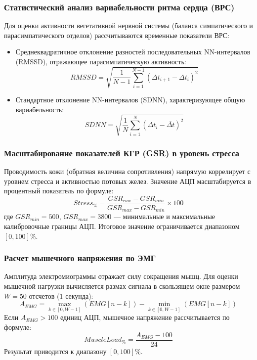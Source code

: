 \documentclass[utf8, russian]{eskdtext}
\begin{document}
\subsubsection{Статистический анализ вариабельности ритма сердца (ВРС)}
Для оценки активности вегетативной нервной системы (баланса симпатического и парасимпатического отделов) рассчитываются временные показатели ВРС:
\begin{itemize}
    \item Среднеквадратичное отклонение разностей последовательных NN-интервалов (RMSSD), отражающее парасимпатическую активность:
          \begin{equation}
              RMSSD = \sqrt{\frac{1}{N-1}\sum_{i=1}^{N-1} (\Delta t_{i+1} - \Delta t_i)^2}
          \end{equation}
    \item Стандартное отклонение NN-интервалов (SDNN), характеризующее общую вариабельность:
          \begin{equation}
              SDNN = \sqrt{\frac{1}{N}\sum_{i=1}^N (\Delta t_i - \overline{\Delta t})^2}
          \end{equation}
\end{itemize}

\subsubsection{Масштабирование показателей КГР (GSR) в уровень стресса}
Проводимость кожи (обратная величина сопротивления) напрямую коррелирует с уровнем стресса и активностью потовых желез. Значение АЦП масштабируется в процентный показатель по формуле:
\begin{equation}
    Stress_{\%} = \frac{GSR_{raw} - GSR_{min}}{GSR_{max} - GSR_{min}} \times 100
\end{equation}
где $GSR_{min} = 500$, $GSR_{max} = 3800$ — минимальные и максимальные калибровочные границы АЦП. Итоговое значение ограничивается диапазоном $[0, 100]\%$.

\subsubsection{Расчет мышечного напряжения по ЭМГ}
Амплитуда электромиограммы отражает силу сокращения мышц. Для оценки мышечной нагрузки вычисляется размах сигнала в скользящем окне размером $W = 50$ отсчетов ($1$ секунда):
\begin{equation}
    A_{EMG} = \max_{k \in [0, W-1]} (EMG[n-k]) - \min_{k \in [0, W-1]} (EMG[n-k])
\end{equation}
Если $A_{EMG} > 100$ единиц АЦП, мышечное напряжение рассчитывается по формуле:
\begin{equation}
    MuscleLoad_{\%} = \frac{A_{EMG} - 100}{24}
\end{equation}
Результат приводится к диапазону $[0, 100]\%$.
\end{document}
